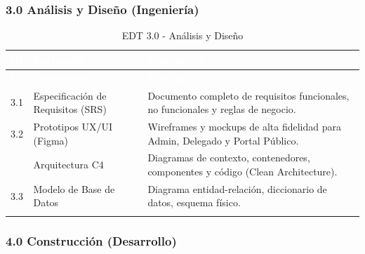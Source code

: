 \documentclass[12pt,a4paper]{article}
\begin{document}
\subsubsection{3.0 Análisis y Diseño (Ingeniería)}

\begin{longtable}{|>{\centering\arraybackslash}p{2.5cm}|>{\raggedright\arraybackslash}p{5cm}|>{\raggedright\arraybackslash}p{7cm}|}
\hline
\rowcolor{headercolor}
\textcolor{white}{\textbf{ID}} & \textcolor{white}{\textbf{Entregable}} & \textcolor{white}{\textbf{Descripción}} \\
\hline
\endfirsthead
\hline
\rowcolor{headercolor}
\textcolor{white}{\textbf{ID}} & \textcolor{white}{\textbf{Entregable}} & \textcolor{white}{\textbf{Descripción}} \\
\hline
\endhead
\hline
\endlastfoot

3.1 & Especificación de Requisitos (SRS) & Documento completo de requisitos funcionales, no funcionales y reglas de negocio. \\
\hline
\rowcolor{rowgray}
3.2 & Prototipos UX/UI (Figma) & Wireframes y mockups de alta fidelidad para Admin, Delegado y Portal Público. \\
\hline
3.3 & Arquitectura C4 & Diagramas de contexto, contenedores, componentes y código (Clean Architecture). \\
\hline
\rowcolor{rowgray}
3.3 & Modelo de Base de Datos & Diagrama entidad-relación, diccionario de datos, esquema físico. \\
\hline
\caption{EDT 3.0 - Análisis y Diseño}
\end{longtable}

\subsubsection{4.0 Construcción (Desarrollo)}
\end{document}
